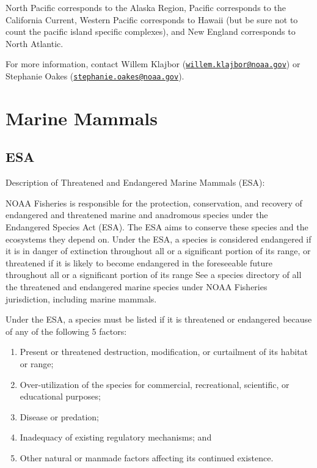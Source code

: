 \documentclass[
]{book}
\begin{document}
North Pacific corresponds to the Alaska Region, Pacific corresponds to the California Current, Western Pacific corresponds to Hawaii (but be sure not to count the pacific island specific complexes), and New England corresponds to North Atlantic.

For more information, contact Willem Klajbor (\href{mailto:willem.klajbor@noaa.gov}{\nolinkurl{willem.klajbor@noaa.gov}}) or Stephanie Oakes (\href{mailto:stephanie.oakes@noaa.gov}{\nolinkurl{stephanie.oakes@noaa.gov}}).

\hypertarget{marine-mammals}{%
\chapter{Marine Mammals}\label{marine-mammals}}

\hypertarget{esa}{%
\section{ESA}\label{esa}}

Description of Threatened and Endangered Marine Mammals (ESA):

NOAA Fisheries is responsible for the protection, conservation, and recovery of endangered and threatened marine and anadromous species under the Endangered Species Act (ESA). The ESA aims to conserve these species and the ecosystems they depend on. Under the ESA, a species is considered endangered if it is in danger of extinction throughout all or a significant portion of its range, or threatened if it is likely to become endangered in the foreseeable future throughout all or a significant portion of its range See a species directory of all the threatened and endangered marine species under NOAA Fisheries jurisdiction, including marine mammals.

Under the ESA, a species must be listed if it is threatened or endangered because of any of the following 5 factors:

\begin{enumerate}
\def\labelenumi{\arabic{enumi})}
\item
  Present or threatened destruction, modification, or curtailment of its habitat or range;
\item
  Over-utilization of the species for commercial, recreational, scientific, or educational purposes;
\item
  Disease or predation;
\item
  Inadequacy of existing regulatory mechanisms; and
\item
  Other natural or manmade factors affecting its continued existence.
\end{enumerate}
\end{document}
